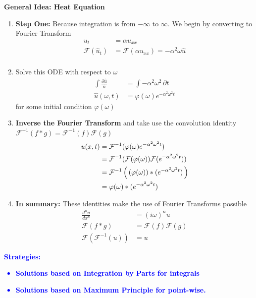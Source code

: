 \documentclass[12pt,a4paper]{report}
\newcommand{\BLUE}[1]{\textcolor{blue}{#1}}
\newcommand{\FFF}{\mathcal{F}}
\begin{document}
{\begin{description}
	\textbf{General Idea: Heat Equation}
	\begin{enumerate}
		\item \textbf{Step One: }Because integration is from $-\infty$ to $\infty$.  We begin by converting to Fourier Transform
		\begin{align*}
			u_t &= \alpha u_{xx} \\
			\FFF(\hat{u}_t) &= \FFF(\alpha u_{xx})= -\alpha^2 \omega \hat{u} \\
		\end{align*}
		\item Solve this ODE with respect to $\omega$
		\begin{align*}
			\int \frac{\partial \hat{u}}{\hat{u}} &= \int -\alpha^2 \omega^2\, \partial t \\
			\hat{u}(\omega, t) &= \varphi(\omega)e^{-\alpha^2\omega^2 t}
		\end{align*}for some initial condition $\varphi(\omega)$
		\item \textbf{Inverse the Fourier Transform} and take use the convolution identity $\FFF^{-1}(f * g) = \FFF^{-1}(f)\FFF(g)$
		\begin{align*}
			u(x,t) &= \FFF^{-1}(\varphi(\omega)e^{-\alpha^2\omega^2 t}) \\
			&= \FFF^{-1}(\FFF(\varphi(\omega))\FFF(e^{-\alpha^2\omega^2 t})) \\
			&= \FFF^{-1}\PAREN{(\varphi(\omega))*(e^{-\alpha^2\omega^2 t})} \\
			&= \varphi(\omega)*(e^{-\alpha^2\omega^2 t})
		\end{align*}
		
		\item \textbf{In summary: }  These identities make the use of Fourier Transforms possible
		\begin{align*}
			\frac{d^n u}{dx^n} &= ( i\omega)^n u \\
			\FFF(f * g) &= \FFF(f)\FFF(g) \\
			\FFF(\FFF^{-1}(u)) &= u
		\end{align*}
	\end{enumerate}
	
	\BLUE{\item \textbf{Strategies:}
	\begin{itemize}
		\item \textbf{Solutions based on Integration by Parts for integrals}
		\item \textbf{Solutions based on Maximum Principle for point-wise.}
	\end{itemize}
	}
\end{description}

}
\end{document}
